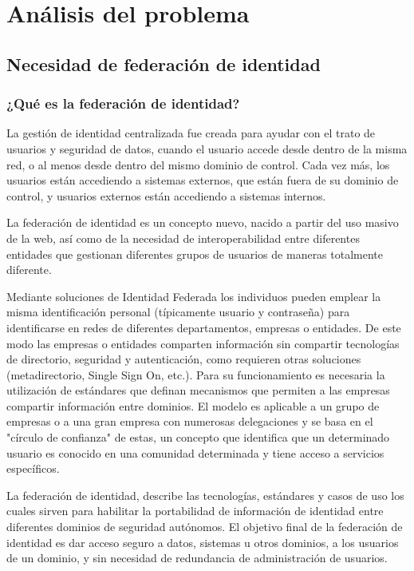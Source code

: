 \chapter{Análisis del problema}
    \section{Necesidad de federación de identidad}
        \subsection{¿Qué es la federación de identidad?}

    La gestión de identidad centralizada fue creada para ayudar con el
    trato de usuarios y seguridad de datos, cuando el usuario accede
    desde dentro de la misma red, o al menos desde dentro del mismo
    dominio de control. Cada vez más, los usuarios están accediendo a
    sistemas externos, que están fuera de su dominio de control, y
    usuarios externos están accediendo a sistemas internos.

    La federación de identidad es un concepto nuevo, nacido a partir
    del uso masivo de la web, así como de la necesidad de
    interoperabilidad entre diferentes entidades que gestionan
    diferentes grupos de usuarios de maneras totalmente diferente.

    Mediante soluciones de Identidad Federada los individuos pueden
    emplear la misma identificación personal (típicamente usuario y
    contraseña) para identificarse en redes de diferentes
    departamentos, empresas o entidades. De este modo las empresas o
    entidades comparten información sin compartir tecnologías de
    directorio, seguridad y autenticación, como requieren otras
    soluciones (metadirectorio, Single Sign On, etc.). Para su
    funcionamiento es necesaria la utilización de estándares que
    definan mecanismos que permiten a las empresas compartir
    información entre dominios. El modelo es aplicable a un grupo de
    empresas o a una gran empresa con numerosas delegaciones y se basa
    en el "círculo de confianza" de estas, un concepto que identifica
    que un determinado usuario es conocido en una comunidad
    determinada y tiene acceso a servicios específicos.

    La federación de identidad, describe las tecnologías, estándares y
    casos de uso los cuales sirven para habilitar la portabilidad de
    información de identidad entre diferentes dominios de seguridad
    autónomos. El objetivo final de la federación de identidad es dar
    acceso seguro a datos, sistemas u otros dominios, a los usuarios
    de un dominio, y sin necesidad de redundancia de administración de
    usuarios.

